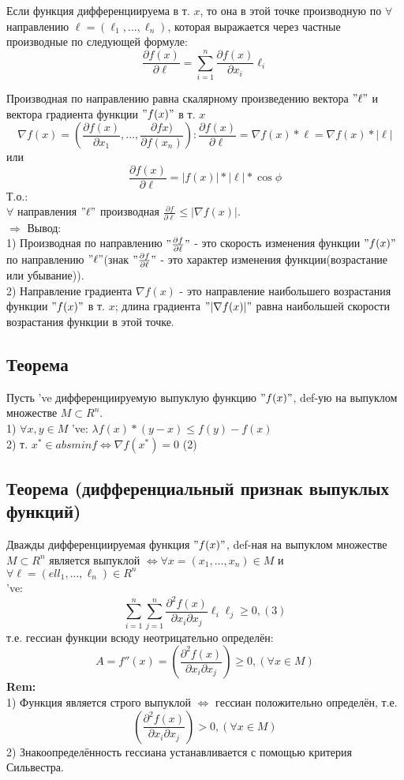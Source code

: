 Если функция дифференциируема в т. $x$, то она в этой точке производную по $\forall$ направлению $\ell = (\ell_1, ... , \ell_n)$, которая выражается через частные производные по следующей формуле: 
$$
\frac{\partial f(x)}{\partial \ell} = \sum_{i = 1}^{n} \frac{\partial f(x)}{\partial x_i} \ell_i
$$



Производная по направлению равна скалярному произведению вектора $"\ell"$ и вектора градиента функции $"f(x)"$ в т. $x$ \\
$$\nabla f(x) = \left(\frac{\partial f(x)}{\partial x_1} , ... , \frac{\partial fx)}{\partial f(x_n)}\right): \frac{\partial f(x)}{\partial \ell} = \nabla f(x) * \ell = \nabla f(x) * |\ell|$$
или \\
$$\frac{\partial f(x)}{\partial \ell} = |f(x)| * |\ell| * \cos{\phi}$$
Т.о.: \\
$\forall$ направления $"\ell"$ производная $\frac{\partial f}{\partial \ell} \leqslant |\nabla f(x)|$. \\
$\Rightarrow$ Вывод: \\
1) Производная по направлению $"\frac{\partial f}{\partial \ell}"$ - это скорость изменения функции $"f(x)"$ по направлению $"\ell"$(знак $"\frac{\partial f}{\partial \ell}"$ - это характер изменения функции(возрастание или убывание)). \\
2) Направление градиента $\nabla f(x)$ - это направление наибольшего возрастания функции $"f(x)"$ в т. $x$; длина градиента $"|\nabla f(x)|"$ равна наибольшей скорости возрастания функции в этой точке. \\
\subsection*{Теорема} 
Пусть 've дифференциируемую выпуклую функцию $"f(x)"$, def-ую на выпуклом множестве $M \subset R^n$. \\
1) $\forall x, y \in M$ 've: $\lambda f(x) * (y-x) \leqslant f(y) - f(x)$ \\
2) т. $x^* \in absminf \Leftrightarrow \nabla f(x^*) = 0$ (2) \\
\subsection*{Теорема (дифференциальный признак выпуклых функций)}
Дважды дифференциируемая функция $"f(x)"$, def-ная на выпуклом множестве $M \subset R^n$ является выпуклой $\Leftrightarrow \forall x = (x_1, ... , x_n) \in M$ и $\forall \ell = (ell_1, ... , \ell_n) \in R^n$ \\
've: 
$$ \sum_{i = 1}^n \sum_{j=1}^n \frac{\partial^2 f(x)}{\partial x_i \partial x_j} \ell_i \ell_j \geqslant 0, (3) $$
т.е. гессиан функции всюду неотрицательно определён: \\
$$ A = f''(x) = \left(\frac{\partial^2 f(x)}{\partial x_i \partial x_j} \right) \geqslant 0, (\forall x \in M)$$
\textbf{Rem:} \\
1) Функция является строго выпуклой $\Leftrightarrow$ гессиан положительно определён, т.е. 
$$ \left(\frac{\partial^2 f(x)}{\partial x_i \partial x_j}\right) > 0, (\forall x \in M)$$
2) Знакоопределённость гессиана устанавливается с помощью критерия Сильвестра.

